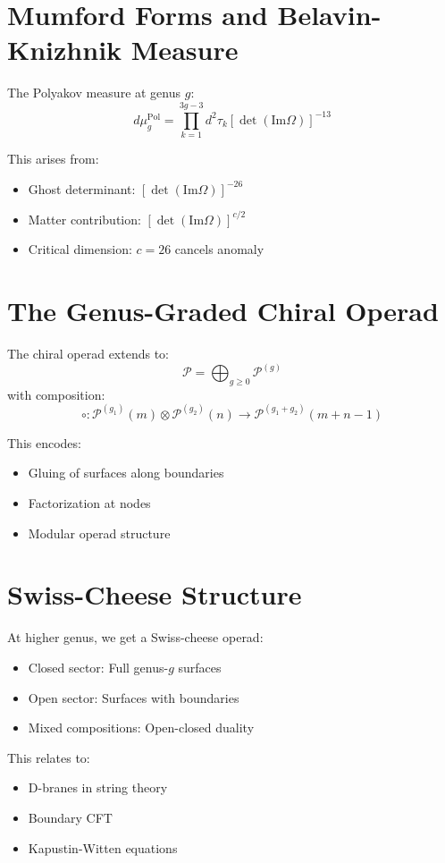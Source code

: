 \section{Mumford Forms and Belavin-Knizhnik Measure}

The Polyakov measure at genus $g$:
$$d\mu_g^{\text{Pol}} = \prod_{k=1}^{3g-3} d^2\tau_k \left[\det(\text{Im}\Omega)\right]^{-13}$$

This arises from:
\begin{itemize}
\item Ghost determinant: $[\det(\text{Im}\Omega)]^{-26}$
\item Matter contribution: $[\det(\text{Im}\Omega)]^{c/2}$
\item Critical dimension: $c = 26$ cancels anomaly
\end{itemize}

\section{The Genus-Graded Chiral Operad}

The chiral operad extends to:
$$\mathcal{P} = \bigoplus_{g \geq 0} \mathcal{P}^{(g)}$$
with composition:
$$\circ: \mathcal{P}^{(g_1)}(m) \otimes \mathcal{P}^{(g_2)}(n) \to \mathcal{P}^{(g_1+g_2)}(m+n-1)$$

This encodes:
\begin{itemize}
\item Gluing of surfaces along boundaries
\item Factorization at nodes
\item Modular operad structure
\end{itemize}

\section{Swiss-Cheese Structure}

At higher genus, we get a Swiss-cheese operad:
\begin{itemize}
\item Closed sector: Full genus-$g$ surfaces
\item Open sector: Surfaces with boundaries
\item Mixed compositions: Open-closed duality
\end{itemize}

This relates to:
\begin{itemize}
\item D-branes in string theory
\item Boundary CFT
\item Kapustin-Witten equations
\end{itemize}

